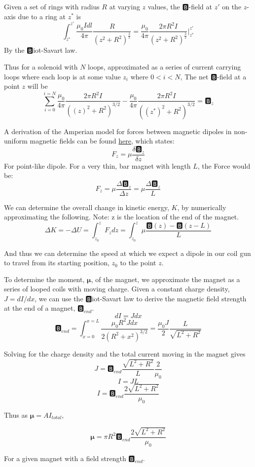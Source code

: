 \documentclass{article}
\begin{document}
	
	Given a set of rings with radius $R$ at varying $z$ values, the $🅱$-field at $z'$ on the $z$-axis due to a ring at $z^*$ is
	\[
		\int_{z^*}^{z'} \frac{\mu_0 Idl}{4\pi} \frac{R}{(z^2 + R^2)^\frac{3}{2}} = 
		\frac{\mu_0}{4\pi} \frac{2 \pi R^2 I}{(z^2 + R^2)^\frac{3}{2}}\Biggr|_{z^*}^{z'}
	\] 
	By the 🅱iot-Savart law.
	
	Thus for a solenoid with $N$ loops, approximated as a series of current carrying loops where each loop is at some value $z_i$ where $0 < i < N$, The net $🅱$-field at a point $z$ will be
	\[
		\sum_{i=0}^{i=N} 
		\frac{\mu_0}{4\pi} \frac{2 \pi R^2 I}{((z)^2 + R^2)^{3/2}} -
		\frac{\mu_0}{4\pi} \frac{2 \pi R^2 I}{((z^*)^2 + R^2)^{3/2}}
		= 🅱_z
	\]
	
	A derivation of the Amperian model for forces between magnetic dipoles in non-uniform magnetic fields can be found \href{www.phys.ufl.edu/~acosta/phy2061/lectures/MagneticDipoles.doc}{here}, which states:
	\[F_z = \mu \frac{\delta 🅱_z}{\delta z}\]
	For point-like dipole. For a very thin, bar magnet with length $L$, the Force would be:
	\[F_z = \mu \frac{\Delta 🅱_z}{\Delta z} = \mu \frac{\Delta 🅱_z}{L}\]
	
	We can determine the overall change in kinetic energy, $K$, by numerically approximating the following. Note: z is the location of the end of the magnet.
	\[
		\Delta K = -\Delta U = \int_{z_0}^{z} F_z dz = 
		\int_{z_0}^{z} \mu \frac{🅱(z) - 🅱(z - L)}{L}
	\]
	
	And thus we can determine the speed at which we expect a dipole in our coil gun to travel from its starting position, $z_0$ to the point $z$.
	
	To determine the moment, $\boldsymbol{\mu}$, of the magnet, we approximate the magnet as a series of looped coils with moving charge. Given a constant charge density, $J = dI/dx$, we can use the 🅱iot-Savart law to derive the magnetic field  strength at the end of a magnet, $🅱_{end}$.    
	$$ dI = Jdx $$
	$$ 
	🅱_{end} = \int_{x=0}^{x=L} \frac {\mu_0 R^2 Jdx} {2(R^2 + x^2)^{3/2}} =
			  \frac {\mu_0J} {2} \frac {L} {\sqrt{L^2 + R^2}}
	$$
	
	Solving for the charge density and the total current moving in the magnet gives
	$$ J = 🅱_{end} \frac{\sqrt{L^2 + R^2}}{L} \frac{2}{\mu_0} $$
	$$ I = JL $$
	$$ I = 🅱_{end} \frac{2 \sqrt{L^2 + R^2}}{\mu_0} $$
	
	Thus as $\boldsymbol{\mu} = AI_{total}$,
	
	$$ \boldsymbol{\mu} = \pi R^2 🅱_{end} \frac{2 \sqrt{L^2 + R^2}}{\mu_0} $$
	
	For a given magnet with a field strength $🅱_{end}$.
	
\end{document}
